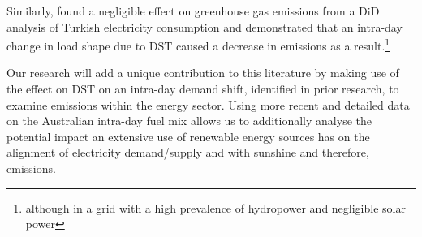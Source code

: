 Similarly, \textcite{turkey} found a negligible effect on greenhouse gas emissions from a \ac{DiD} analysis of Turkish electricity consumption and demonstrated that an intra-day change in load shape due to \ac{DST} caused a decrease in emissions as a result.\footnote{although in a grid with a high prevalence of hydropower and negligible solar power}

Our research will add a unique contribution to this literature by making use of the effect on \ac{DST} on an intra-day demand shift, identified in prior research, to examine emissions within the energy sector. Using more recent and detailed data on the Australian intra-day fuel mix allows us to additionally analyse the potential impact an extensive use of renewable energy sources has on the alignment of electricity demand/supply and with sunshine and therefore, emissions.

